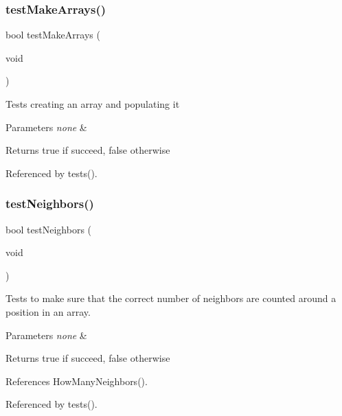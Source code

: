 \mbox{\label{tests_8h_af6e338851f3ccb4714e1bfb06ec4b428}} 
\subsubsection{test\+Make\+Arrays()}
{\footnotesize\ttfamily bool test\+Make\+Arrays (\begin{DoxyParamCaption}\item[{void}]{ }\end{DoxyParamCaption})}

Tests creating an array and populating it 
\begin{DoxyParams}{Parameters}
{\em none} & \\
\hline
\end{DoxyParams}
\begin{DoxyReturn}{Returns}
true if succeed, false otherwise 
\end{DoxyReturn}


Referenced by tests().

\mbox{\label{tests_8h_a3809ae80cb3300c9a6d248b7db6a1a99}} 
\subsubsection{test\+Neighbors()}
{\footnotesize\ttfamily bool test\+Neighbors (\begin{DoxyParamCaption}\item[{void}]{ }\end{DoxyParamCaption})}

Tests to make sure that the correct number of neighbors are counted around a position in an array. 
\begin{DoxyParams}{Parameters}
{\em none} & \\
\hline
\end{DoxyParams}
\begin{DoxyReturn}{Returns}
true if succeed, false otherwise 
\end{DoxyReturn}


References How\+Many\+Neighbors().



Referenced by tests().

\mbox{\label{tests_8h_aa4c8095a20d90a18d843ab63ecd02d00}} 
